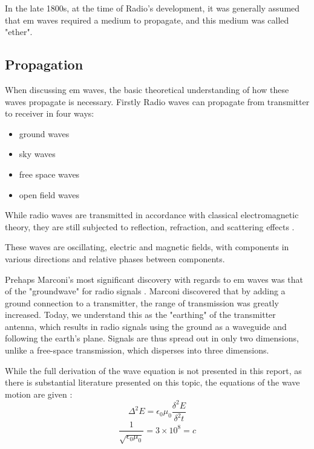 \documentclass[class=report,11pt,crop=false]{standalone}
\begin{document}
In the late 1800s, at the time of Radio's development, it was generally assumed that \gls{em} waves required a medium to propagate, and this medium was called "ether".
\subsection{Propagation}
When discussing \gls{em} waves, the basic theoretical understanding of how these waves propagate is necessary. Firstly Radio waves can propagate from transmitter to receiver in four ways: 
\begin{itemize}
    \setlength{\itemsep}{0pt}
    \item ground waves
    \item sky waves
    \item free space waves
    \item open field waves
\end{itemize}

While radio waves are transmitted in accordance with classical electromagnetic theory, they are still subjected to reflection, refraction, and scattering effects \cite{radio-propagation}.

These waves are oscillating, electric and magnetic fields, with components in various directions and relative phases between components. 

Prehaps Marconi's most significant discovery with regards to \gls{em} waves was that of the "groundwave" for radio signals \cite{radio-history}. Marconi discovered that by adding a ground connection to a transmitter, the range of transmission was greatly increased. Today, we understand this as the  "earthing" of the transmitter antenna, which results in radio signals using the ground as a waveguide and following the earth's plane. Signals are thus spread out in only two dimensions, unlike a free-space transmission, which disperses into three dimensions.

While the full derivation of the wave equation is not presented in this report, as there is substantial literature presented on this topic, the equations of the wave motion are given \cite{radio-waves}:
\begin{equation}
    \Delta^2 E = \epsilon_0 \mu_0 \frac{\delta^2 E}{\delta^2 t}
\end{equation}
\begin{equation}
    \frac{1}{\sqrt{\epsilon_0 \mu_0}} = 3 \times 10^ 8 = c
\end{equation}
\end{document}
